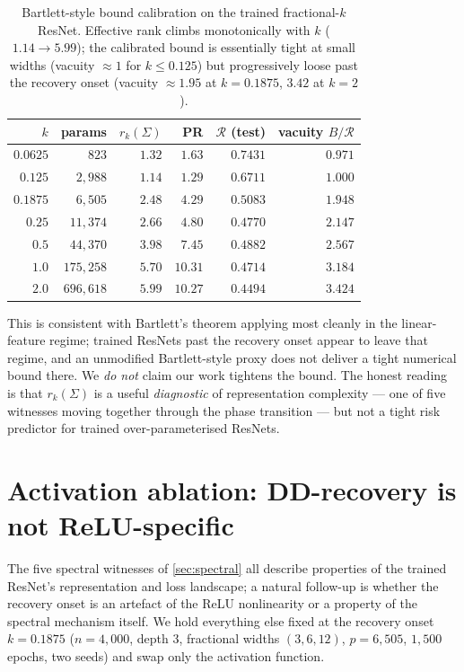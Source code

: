 \documentclass{article}
\begin{document}
\begin{table}[h]
  \centering
  \small
  \caption{Bartlett-style bound calibration on the trained fractional-$k$ ResNet. Effective rank climbs monotonically with $k$ ($1.14\!\to\!5.99$); the calibrated bound is essentially tight at small widths (vacuity $\approx 1$ for $k \le 0.125$) but progressively loose past the recovery onset (vacuity $\approx 1.95$ at $k\!=\!0.1875$, $3.42$ at $k\!=\!2$).}
  \label{tab:bartlett-vacuity}
  \begin{tabular}{rrrrrr}
    \toprule
    $k$ & params & $r_k(\Sigma)$ & PR & $\mathcal{R}$ (test) & vacuity $B/\mathcal{R}$ \\
    \midrule
    $0.0625$ & $823$    & $1.32$ & $1.63$  & $0.7431$ & $\mathbf{0.971}$ \\
    $0.125$  & $2{,}988$ & $1.14$ & $1.29$  & $0.6711$ & $\mathbf{1.000}$ \\
    $0.1875$ & $6{,}505$ & $2.48$ & $4.29$  & $0.5083$ & $1.948$ \\
    $0.25$   & $11{,}374$ & $2.66$ & $4.80$  & $0.4770$ & $2.147$ \\
    $0.5$    & $44{,}370$ & $3.98$ & $7.45$  & $0.4882$ & $2.567$ \\
    $1.0$    & $175{,}258$ & $5.70$ & $10.31$ & $0.4714$ & $3.184$ \\
    $2.0$    & $696{,}618$ & $5.99$ & $10.27$ & $0.4494$ & $\mathbf{3.424}$ \\
    \bottomrule
  \end{tabular}
\end{table}

This is consistent with Bartlett's theorem applying most cleanly in the linear-feature regime; trained ResNets past the recovery onset appear to leave that regime, and an unmodified Bartlett-style proxy does not deliver a tight numerical bound there. We \emph{do not} claim our work tightens the bound. The honest reading is that $r_k(\Sigma)$ is a useful \emph{diagnostic} of representation complexity --- one of five witnesses moving together through the phase transition --- but not a tight risk predictor for trained over-parameterised ResNets.

\section{Activation ablation: DD-recovery is not ReLU-specific}
\label{app:activation}

The five spectral witnesses of \cref{sec:spectral} all describe properties of the trained ResNet's representation and loss landscape; a natural follow-up is whether the recovery onset is an artefact of the ReLU nonlinearity or a property of the spectral mechanism itself. We hold everything else fixed at the recovery onset $k\!=\!0.1875$ ($n\!=\!4{,}000$, depth $3$, fractional widths $(3,6,12)$, $p\!=\!6{,}505$, $1{,}500$ epochs, two seeds) and swap only the activation function.
\end{document}
